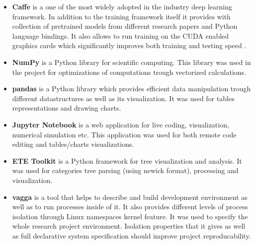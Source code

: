 \begin{itemize}
    \item \textbf{Caffe} \cite{Jia2014} is a one of the most widely adopted in the industry deep learning framework. In addition to the training framework itself it provides with collection of pretrained models from different research papers \cite{BerkeleyVisionandLearningCenter} and Python language bindings. It also allows to run training on the CUDA \cite{CUDA} enabled graphics cards which significantly improves both training and testing speed \cite{Krizhevsky2012}.
    \item \textbf{NumPy} \cite{numpy} is a Python library for scientific computing. This library was used in the project for optimizations of computations trough vectorized calculations.
    \item \textbf{pandas} \cite{pandas} is a Python library which provides efficient data manipulation trough different datastructures as well as its visualization. It was used for tables representations and drawing charts.
    \item \textbf{Jupyter Notebook} \cite{jupyter} is a web application for live coding, visualization, numerical simulation etc. This application was used for both remote code editing and tables/charts visualizations.
    \item \textbf{ETE Toolkit} \cite{ete3} is a Python framework for tree visualization and analysis. It was used for categories tree parsing (using newick \cite{newick} format), processing and visualization.
    \item \textbf{vagga} \cite{vagga} is a tool that helps to describe and build development environment as well as to run processes inside of it. It also provides different levels of process isolation through Linux namespaces \cite{namespaces} kernel feature. It was used to specify the whole research project environment. Isolation properties that it gives as well as full declarative system specification should improve project reproducability.
\end{itemize}

